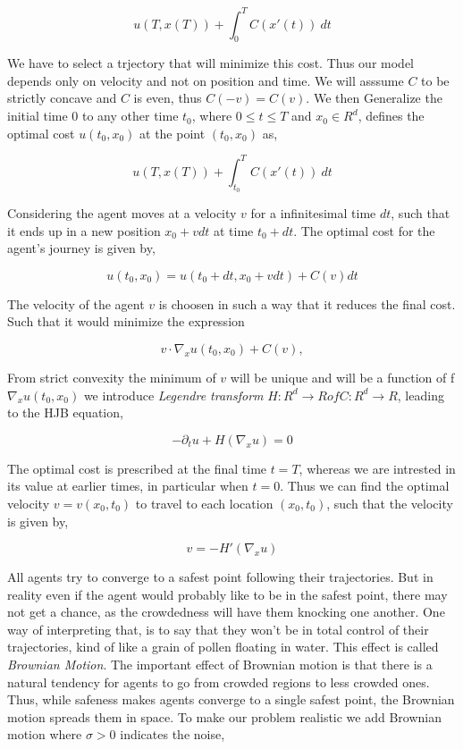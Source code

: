\documentclass[a4paper, 10pt, conference]{ieeeconf}      %
\begin{document}
$$\displaystyle  u(T, x(T)) + \int_0^TC(x'(t))\ dt$$

We have to select a trjectory that will minimize this cost. Thus our model depends only on velocity and not on position and time. We will asssume $C$ to be strictly concave and $C$ is even, thus $C(-v)=C(v)$. We then Generalize the initial time $0$ to any other time $t_0$, where $0 \leq t \leq T$ and $x_0 \in R^d$, defines the optimal cost $u(t_0, x_0)$ at the point $(t_0, x_0)$ as, 

$$\displaystyle  u(T, x(T)) + \int_{t_0}^TC(x'(t))\ dt$$

Considering the agent moves at a velocity $v$ for a infinitesimal time $dt$, such that it ends up in a new position $x_0 + vdt$ at time $t_0 + dt$. The optimal cost for the agent's journey is given by,

$$\displaystyle u(t_0,x_0) = u(t_0+dt,x_0+vdt) + C(v) dt$$

The velocity of the agent $v$ is choosen in such a way that it reduces the final cost. Such that it would minimize the expression

$$\displaystyle v \cdot \nabla_x u(t_0,x_0) + C(v),$$

From strict convexity the minimum of $v$ will be unique and will be a function of f ${\nabla_x u(t_0,x_0)}$ we introduce \emph{Legendre transform} ${H: {R}^d \rightarrow {R}} of {C: {R}^d \rightarrow {R}}$, leading to the HJB equation,

$$\displaystyle -\partial_t u + H(\nabla_x u) = 0$$

The optimal cost is prescribed at the final time $t = T$, whereas we are intrested in its value at earlier times, in particular when $t = 0$. Thus we can find the optimal velocity $v = v(x_0, t_0)$ to travel to each location $(x_0, t_0)$, such that the velocity is given by, 

$$\displaystyle v = - H'( \nabla_x u )$$

All agents try to converge to a safest point following their trajectories. But in reality even if the agent would probably like to be in the safest point, there may not get a chance, as the crowdedness will have them knocking one another. One way of interpreting that, is to say that they won’t be in total control of their trajectories, kind of like a grain of pollen floating in water. This effect is called \emph{Brownian Motion}. The important effect of Brownian motion is that there is a natural tendency for agents to go from crowded regions to less crowded ones. Thus, while safeness makes agents converge to a single safest point, the Brownian motion spreads them in space\cite{b8}. To make our problem realistic we add Brownian motion where $\sigma > 0$ indicates the noise,
\end{document}
